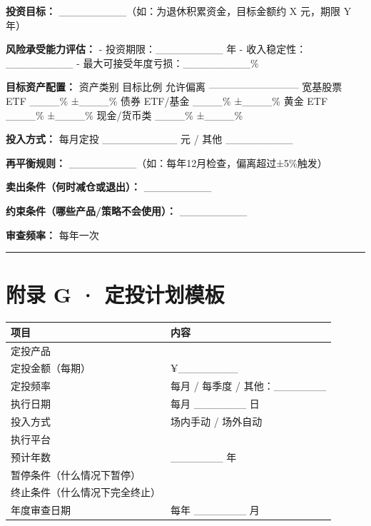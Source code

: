 \documentclass[a4paper,11pt,oneside,fontset=none,UTF8,zihao=-4]{ctexbook}
\begin{document}
\textbf{投资目标：} \_\_\_\_\_\_\_\_\_（如：为退休积累资金，目标金额约 X
元，期限 Y 年）

\textbf{风险承受能力评估：} - 投资期限：\_\_\_\_\_\_\_\_\_ 年 -
收入稳定性：\_\_\_\_\_\_\_\_\_ -
最大可接受年度亏损：\_\_\_\_\_\_\_\_\_\%

\textbf{目标资产配置：} \textbar{} 资产类别 \textbar{} 目标比例
\textbar{} 允许偏离 \textbar{}
\textbar---------\textbar---------\textbar---------\textbar{} \textbar{}
宽基股票 ETF \textbar{} \_\_\_\_\% \textbar{} ±\_\_\_\_\% \textbar{}
\textbar{} 债券 ETF/基金 \textbar{} \_\_\_\_\% \textbar{} ±\_\_\_\_\%
\textbar{} \textbar{} 黄金 ETF \textbar{} \_\_\_\_\% \textbar{}
±\_\_\_\_\% \textbar{} \textbar{} 现金/货币类 \textbar{} \_\_\_\_\%
\textbar{} ±\_\_\_\_\% \textbar{}

\textbf{投入方式：} 每月定投 \_\_\_\_\_\_\_\_\_\_ 元 / 其他
\_\_\_\_\_\_\_\_\_

\textbf{再平衡规则：}
\_\_\_\_\_\_\_\_\_（如：每年12月检查，偏离超过±5\%触发）

\textbf{卖出条件（何时减仓或退出）：} \_\_\_\_\_\_\_\_\_

\textbf{约束条件（哪些产品/策略不会使用）：} \_\_\_\_\_\_\_\_\_

\textbf{审查频率：} 每年一次

\begin{center}{\color{dh-bronze}\rule{0.2\textwidth}{0.5pt}}\end{center}

\section{附录 G ·
定投计划模板}\label{ux9644ux5f55-g-ux5b9aux6295ux8ba1ux5212ux6a21ux677f}

\begin{longtable}[]{@{}ll@{}}
\toprule\noalign{}\rowcolor{dh-pink!25}
项目 & 内容 \\
\midrule\noalign{}
\endhead
\bottomrule\noalign{}
\endlastfoot
定投产品 & \\
定投金额（每期） & ¥\_\_\_\_\_\_\_\_ \\
定投频率 & 每月 / 每季度 / 其他：\_\_\_\_\_\_\_ \\
执行日期 & 每月 \_\_\_\_\_\_\_ 日 \\
投入方式 & 场内手动 / 场外自动 \\
执行平台 & \\
预计年数 & \_\_\_\_\_\_\_ 年 \\
暂停条件（什么情况下暂停） & \\
终止条件（什么情况下完全终止） & \\
年度审查日期 & 每年 \_\_\_\_\_\_\_ 月 \\
\end{longtable}
\end{document}
